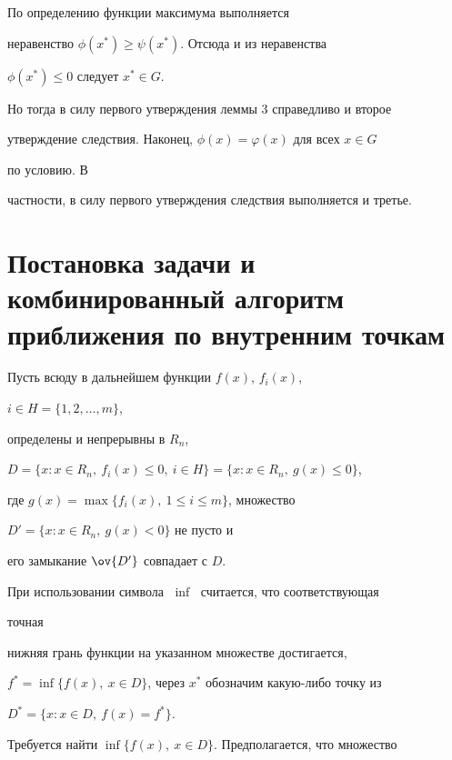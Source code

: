  


\begin{pf} По определению функции максимума выполняется 


неравенство $\phi(x^*)\ge\psi(x^*)$. Отсюда и из неравенства 


$\phi(x^*)\le 0$ следует $x^*\in G$. 


Но тогда в силу первого утверждения леммы 3 справедливо и второе 


утверждение следствия. Наконец, $\phi(x)=\varphi(x)$ для всех $x\in G$ 


по условию. В 


частности, в силу первого утверждения следствия выполняется и третье. 


\end{pf} 


 


\section{Постановка задачи и комбинированный алгоритм\protect\\ 


приближения по внутренним точкам} 


 


Пусть всюду в дальнейшем функции $f(x)$, $f_i(x)$, 


$i\in H=\{1,2,\dotsc,m\}$,


определены и непрерывны в $R_n$, 


$D=\{x:x\in R_n,\ f_i(x)\le 0,\ i \in H\}= 


\{x:x\in R_n,\ g(x)\le 0\}$, 


где $g(x)=\max\{f_i(x),\ 1\le i\le m\}$, множество 


$D'=\{x:x\in R_n,\ g(x)<0\}$ не пусто и 


его замыкание $\ov{D'}$ совпадает с $D$. 


При использовании символа $\;\inf\;$ считается, что соответствующая 


точная 


нижняя грань функции на указанном множестве достигается, 


$f^*=\inf\{f(x),\ x\in D\}$, через $x^*$ обозначим какую-либо точку из 


$D^*=\{x:x\in D,\ f(x)=f^*\}$. 


Требуется найти $\inf\{f(x),\ x\in D\}$. Предполагается, что множество 


